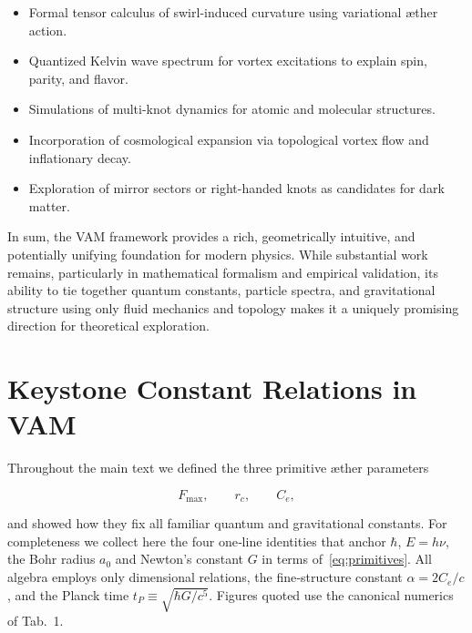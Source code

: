 \documentclass[a4paper,12pt]{article}
\begin{document}
\begin{itemize}
    \item Formal tensor calculus of swirl-induced curvature using variational æther action.
    \item Quantized Kelvin wave spectrum for vortex excitations to explain spin, parity, and flavor.
    \item Simulations of multi-knot dynamics for atomic and molecular structures.
    \item Incorporation of cosmological expansion via topological vortex flow and inflationary decay.
    \item Exploration of mirror sectors or right-handed knots as candidates for dark matter.
\end{itemize}

In sum, the VAM framework provides a rich, geometrically intuitive, and potentially unifying foundation for modern physics. While substantial work remains, particularly in mathematical formalism and empirical validation, its ability to tie together quantum constants, particle spectra, and gravitational structure using only fluid mechanics and topology makes it a uniquely promising direction for theoretical exploration.





    \appendix


\section{Keystone Constant Relations in VAM}\label{sec:keystone-constant-relations-in-vam}

    Throughout the main text we defined the three primitive æther parameters

    \begin{equation}
        F_{\max}, \qquad r_c, \qquad C_e,
        \label{eq:primitives}
    \end{equation}

    and showed how they fix all familiar quantum and gravitational constants. For completeness we collect here the four one‑line identities that anchor \(\hbar\), \(E=h\nu\), the Bohr radius \(a_0\) and Newton's constant \(G\) in terms of~\eqref{eq:primitives}. All algebra employs only dimensional relations, the fine‑structure constant \(\alpha=2C_e/c\), and the Planck time \(t_P\equiv\sqrt{\hbar G/c^{5}}\). Figures quoted use the canonical numerics of Tab.~1.

\end{document}

